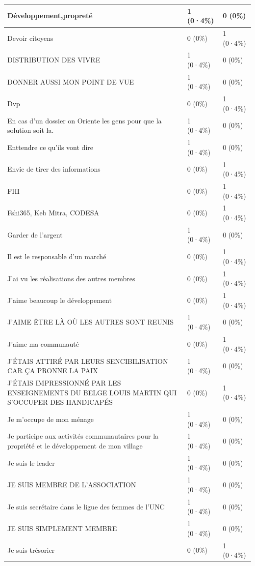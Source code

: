 \documentclass[
]{book}
\begin{document}
\begin{tabular}{l|l|l}
\hline
Développement,propreté & 1 (0·4\%) & 0 (0\%)\\
\hline
Devoir citoyens & 0 (0\%) & 1 (0·4\%)\\
\hline
DISTRIBUTION DES VIVRE & 1 (0·4\%) & 0 (0\%)\\
\hline
DONNER AUSSI MON POINT DE VUE & 1 (0·4\%) & 0 (0\%)\\
\hline
Dvp & 0 (0\%) & 1 (0·4\%)\\
\hline
En cas d'un dossier on Oriente les gens pour que la solution soit la. & 1 (0·4\%) & 0 (0\%)\\
\hline
Enttendre ce qu'ils vont dire & 1 (0·4\%) & 0 (0\%)\\
\hline
Envie de tirer des informations & 0 (0\%) & 1 (0·4\%)\\
\hline
FHI & 0 (0\%) & 1 (0·4\%)\\
\hline
Fshi365, Keb Mitra, CODESA & 0 (0\%) & 1 (0·4\%)\\
\hline
Garder de l'argent & 1 (0·4\%) & 0 (0\%)\\
\hline
Il est le responsable d'un marché & 0 (0\%) & 1 (0·4\%)\\
\hline
J'ai vu les réalisations des autres membres & 0 (0\%) & 1 (0·4\%)\\
\hline
J'aime beaucoup le développement & 0 (0\%) & 1 (0·4\%)\\
\hline
J'AIME ÊTRE LÀ OÙ LES AUTRES SONT REUNIS & 1 (0·4\%) & 0 (0\%)\\
\hline
J'aime ma communauté & 0 (0\%) & 1 (0·4\%)\\
\hline
J'ÉTAIS ATTIRÉ PAR LEURS SENCIBILISATION CAR   ÇA PRONNE LA PAIX & 1 (0·4\%) & 0 (0\%)\\
\hline
J'ÉTAIS IMPRESSIONNÉ PAR LES ENSEIGNEMENTS DU BELGE LOUIS MARTIN QUI S'OCCUPER DES HANDICAPÉS & 0 (0\%) & 1 (0·4\%)\\
\hline
Je m'occupe de mon ménage & 1 (0·4\%) & 0 (0\%)\\
\hline
Je participe aux activités communautaires pour la propriété et le développement de mon village & 1 (0·4\%) & 0 (0\%)\\
\hline
Je suis le leader & 1 (0·4\%) & 0 (0\%)\\
\hline
JE SUIS MEMBRE DE L'ASSOCIATION & 1 (0·4\%) & 0 (0\%)\\
\hline
Je suis secrétaire dans le ligue des femmes de l'UNC & 1 (0·4\%) & 0 (0\%)\\
\hline
JE SUIS SIMPLEMENT MEMBRE & 1 (0·4\%) & 0 (0\%)\\
\hline
Je suis trésorier & 0 (0\%) & 1 (0·4\%)\\

\end{tabular}
\end{document}
